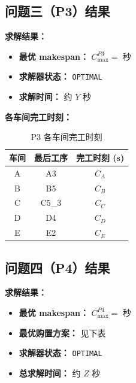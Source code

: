 \documentclass[UTF8,a4paper,12pt]{ctexart}
\begin{document}
\subsection{问题三（P3）结果}
\textbf{求解结果：}
\begin{itemize}
  \item \textbf{最优 makespan：} $C_{\max}^{P3} =$ 秒
  \item \textbf{求解器状态：} \texttt{OPTIMAL}
  \item \textbf{求解时间：} 约 $Y$ 秒
\end{itemize}

\textbf{各车间完工时刻：}
\begin{table}[htbp]
  \centering
  \caption{P3 各车间完工时刻}
  \label{tab:p3_shop_completion}
  \begin{tabular}{ccc}
    \toprule
    车间 & 最后工序 & 完工时刻 (s) \\
    \midrule
    A & A3 & $C_A$ \\
    B & B5 & $C_B$ \\
    C & C5\_3 & $C_C$ \\
    D & D4 & $C_D$ \\
    E & E2 & $C_E$ \\
    \bottomrule
  \end{tabular}
\end{table}

\subsection{问题四（P4）结果}
\textbf{求解结果：}
\begin{itemize}
  \item \textbf{最优 makespan：} $C_{\max}^{P4} =$ 秒
  \item \textbf{最优购置方案：} 见下表
  \item \textbf{求解器状态：} \texttt{OPTIMAL}
  \item \textbf{总求解时间：} 约 $Z$ 秒
\end{itemize}
\end{document}
